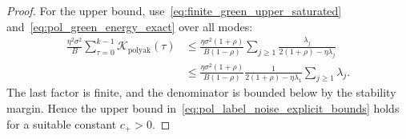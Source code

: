 \documentclass[11pt]{article}
\newcommand{\polyak}{\mathrm{polyak}}
\begin{document}
\begin{proof}
For the upper bound, use~\eqref{eq:finite_green_upper_saturated} and~\eqref{eq:pol_green_energy_exact} over all modes:
\begin{align*}
    \frac{\eta^2\sigma^2}{B}\sum_{\tau=0}^{k-1}\mathcal K_{\polyak}(\tau)
    &\le
    \frac{\eta\sigma^2(1+\rho)}{B(1-\rho)}
    \sum_{j\ge1}\frac{\lambda_j}{2(1+\rho)-\eta\lambda_j} \\
    &\le
    \frac{\eta\sigma^2(1+\rho)}{B(1-\rho)}
    \frac{1}{2(1+\rho)-\eta\lambda_1}
    \sum_{j\ge1}\lambda_j.
\end{align*}
The last factor is finite, and the denominator is bounded below by the stability margin. Hence the upper bound in~\eqref{eq:pol_label_noise_explicit_bounds} holds for a suitable constant $c_+>0$.
\end{proof}




\end{document}
